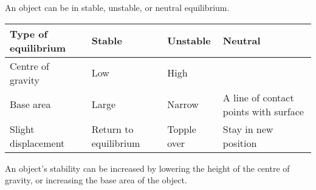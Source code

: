 \documentclass[../main.tex]{subfiles}
\begin{document}
	
		An object can be in stable, unstable, or neutral equilibrium.
		\begin{center}
		\begin{tabularx}{\linewidth}{X|XXX}
			\hline \hline
			Type of equilibrium & Stable & Unstable & Neutral \\
			\hline
			Centre of gravity & Low & High & \\
			Base area & Large & Narrow & A line of contact points with surface \\
			Slight displacement & Return to equilibrium & Topple over & Stay in new position \\
			\hline \hline
		\end{tabularx}
		\end{center}
	
		An object's stability can be increased by lowering the height of the centre of gravity, or increasing the base area of the object.
\end{document}

